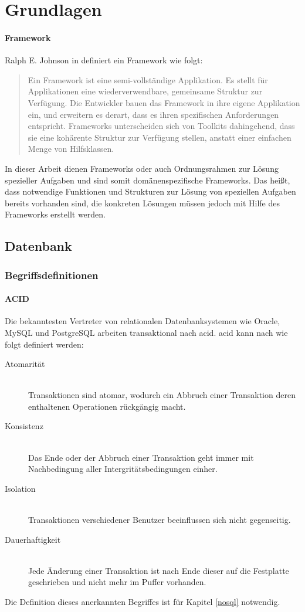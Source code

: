 \chapter{Grundlagen}
\label{Grundlagen}

\subsubsection{Framework}
Ralph E. Johnson in \cite{website:wiki-framework} definiert ein Framework wie folgt:
\begin{quote}
Ein Framework ist eine semi-vollständige Applikation. Es stellt für Applikationen eine wiederverwendbare, gemeinsame Struktur zur Verfügung. Die Entwickler bauen das Framework in ihre eigene Applikation ein, und erweitern es derart, dass es ihren spezifischen Anforderungen entspricht. Frameworks unterscheiden sich von Toolkits dahingehend, dass sie eine kohärente Struktur zur Verfügung stellen, anstatt einer einfachen Menge von Hilfsklassen.
\end{quote}
In dieser Arbeit dienen Frameworks oder auch Ordnungsrahmen zur Lösung spezieller Aufgaben und sind somit domänenspezifische Frameworks.
Das heißt, dass notwendige Funktionen und Strukturen zur Lösung von speziellen Aufgaben bereits vorhanden sind, die konkreten Lösungen müssen jedoch mit Hilfe des Frameworks erstellt werden.


\section{Datenbank}

\subsection{Begriffsdefinitionen}

\subsubsection{ACID}
Die bekanntesten Vertreter von relationalen Datenbanksystemen wie Oracle, MySQL und PostgreSQL arbeiten transaktional nach \Gls{acid}.
\Gls{acid} kann nach \cite[S.262]{book:kudrass} wie folgt definiert werden:
\begin{description}
\item[Atomarität] \hfill \\
Transaktionen sind atomar, wodurch ein Abbruch einer Transaktion deren enthaltenen Operationen rückgängig macht.
\item[Konsistenz] \hfill \\
Das Ende oder der Abbruch einer Transaktion geht immer mit Nachbedingung aller Intergritätsbedingungen einher.
\item[Isolation] \hfill \\
Transaktionen verschiedener Benutzer beeinflussen sich nicht gegenseitig.
\item[Dauerhaftigkeit] \hfill \\
Jede Änderung einer Transaktion ist nach Ende dieser auf die Festplatte geschrieben und nicht mehr im Puffer vorhanden.
\end{description}
Die Definition dieses anerkannten Begriffes ist für Kapitel \ref{nosql} notwendig.

